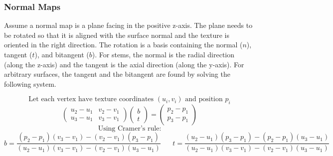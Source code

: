 \documentclass[10pt]{article}
\newcommand\m[1]{\begin{pmatrix}#1\end{pmatrix}}
\begin{document}
\subsubsection{Normal Maps}

Assume a normal map is a plane facing in the positive z-axis. The plane needs to be rotated so that it is aligned with the surface normal and the texture is oriented in the right direction. The rotation is a basis containing the normal ($ n $), tangent ($ t $), and bitangent ($ b $). For stems, the normal is the radial direction (along the z-axis) and the tangent is the axial direction (along the y-axis). For arbitrary surfaces, the tangent and the bitangent are found by solving the following system.

\[ \text{Let each vertex have texture coordinates } (u_i, v_i) \text{ and position } p_i \]
\[ \m{u_2-u_1 & v_2-v_1 \\ u_3-u_1 & v_3-v_1} \m{b \\ t} = \m{p_2-p_1 \\ p_3-p_1}  \]
\[ \text{Using Cramer's rule:} \]
\[ b = \frac{(p_2 - p_1)(v_3-v_1)-(v_2-v_1)(p_3-p_1)}{(u_2-u_1)(v_3 - v_1)-(v_2-v_1)(u_3-u_1)} \hspace{20pt}
t = \frac{(u_2-u_1)(p_3-p_1)-(p_2-p_1)(u_3-u_1)}{(u_2-u_1)(v_3-v_1)-(v_2-v_1)(u_3-u_1)} \]
\end{document}
